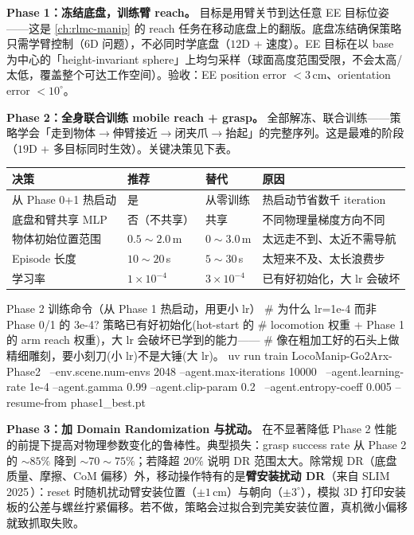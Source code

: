 \textbf{Phase 1：冻结底盘，训练臂 reach。} 目标是用臂关节到达任意 EE 目标位姿——这是 \cref{ch:rlmc-manip} 的 reach 任务在移动底盘上的翻版。底盘冻结确保策略只需学臂控制（$6$D 问题），不必同时学底盘（$12$D + 速度）。EE 目标在以 base 为中心的「height-invariant sphere」上均匀采样（球面高度范围受限，不会太高/太低，覆盖整个可达工作空间）。验收：EE position error $<3\,$cm、orientation error $<10^\circ$。

\textbf{Phase 2：全身联合训练 mobile reach + grasp。} 全部解冻、联合训练——策略学会「走到物体$\to$伸臂接近$\to$闭夹爪$\to$抬起」的完整序列。这是最难的阶段（$19$D + 多目标同时生效）。关键决策见下表。

\begin{center}
\small
\begin{tabular}{@{}llll@{}}
\toprule
决策 & 推荐 & 替代 & 原因 \\
\midrule
从 Phase 0+1 热启动 & 是 & 从零训练 & 热启动节省数千 iteration \\
底盘和臂共享 MLP & 否（不共享） & 共享 & 不同物理量梯度方向不同 \\
物体初始位置范围 & $0.5\!\sim\!2.0\,$m & $0\!\sim\!3.0\,$m & 太远走不到、太近不需导航 \\
Episode 长度 & $10\!\sim\!20\,$s & $5\!\sim\!30\,$s & 太短来不及、太长浪费步 \\
学习率 & $1\times10^{-4}$ & $3\times10^{-4}$ & 已有好初始化，大 lr 会破坏 \\
\bottomrule
\end{tabular}
\end{center}

\begin{codebox}[bash]{Phase 2 训练命令（从 Phase 1 热启动，用更小 lr）}
# 为什么 lr=1e-4 而非 Phase 0/1 的 3e-4? 策略已有好初始化(hot-start 的
# locomotion 权重 + Phase 1 的 arm reach 权重)，大 lr 会破坏已学到的能力——
# 像在粗加工好的石头上做精细雕刻，要小刻刀(小 lr)不是大锤(大 lr)。
uv run train LocoManip-Go2Arx-Phase2 \
  --env.scene.num-envs 2048 --agent.max-iterations 10000 \
  --agent.learning-rate 1e-4 --agent.gamma 0.99 --agent.clip-param 0.2 \
  --agent.entropy-coeff 0.005 --resume-from phase1_best.pt
\end{codebox}

\textbf{Phase 3：加 Domain Randomization 与扰动。} 在不显著降低 Phase 2 性能的前提下提高对物理参数变化的鲁棒性。典型损失：grasp success rate 从 Phase 2 的 $\sim\!85\%$ 降到 $\sim\!70\!\sim\!75\%$；若降超 $20\%$ 说明 DR 范围太大。除常规 DR（底盘质量、摩擦、CoM 偏移）外，移动操作特有的是\textbf{臂安装扰动 DR}（来自 SLIM 2025\,\cite{wang2025slim}）：reset 时随机扰动臂安装位置（$\pm1\,$cm）与朝向（$\pm3^\circ$），模拟 3D 打印安装板的公差与螺丝拧紧偏移。若不做，策略会过拟合到完美安装位置，真机微小偏移就致抓取失败。

